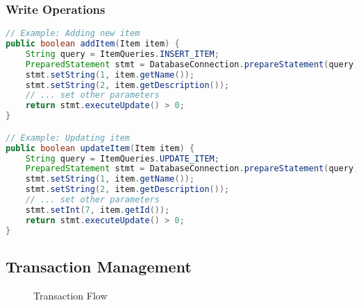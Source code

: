 \documentclass[12pt,a4paper]{article}
\begin{document}
\subsubsection{Write Operations}
\begin{lstlisting}[language=Java]
// Example: Adding new item
public boolean addItem(Item item) {
    String query = ItemQueries.INSERT_ITEM;
    PreparedStatement stmt = DatabaseConnection.prepareStatement(query);
    stmt.setString(1, item.getName());
    stmt.setString(2, item.getDescription());
    // ... set other parameters
    return stmt.executeUpdate() > 0;
}

// Example: Updating item
public boolean updateItem(Item item) {
    String query = ItemQueries.UPDATE_ITEM;
    PreparedStatement stmt = DatabaseConnection.prepareStatement(query);
    stmt.setString(1, item.getName());
    stmt.setString(2, item.getDescription());
    // ... set other parameters
    stmt.setInt(7, item.getId());
    return stmt.executeUpdate() > 0;
}
\end{lstlisting}

\subsection{Transaction Management}

\begin{figure}[h]
\centering
{}
\caption{Transaction Flow}
\end{figure}
\end{document}
